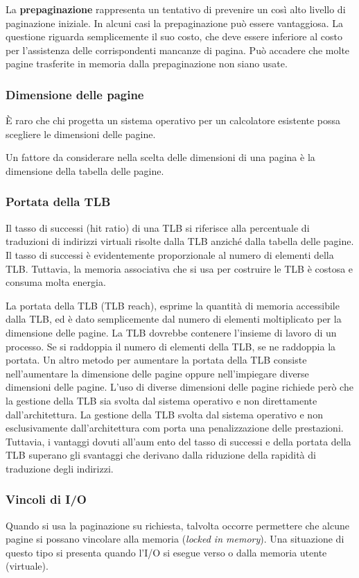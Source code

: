 \documentclass[11pt,a4paper]{article}
\begin{document}
{La \textbf{prepagina­zione} rappresenta un tentativo di prevenire un così alto livello di paginazione iniziale.
In alcuni casi la prepaginazione può essere vantaggiosa. La questione riguarda sempli­cemente il suo costo, che deve essere inferiore al costo per l'assistenza delle corrispondenti
mancanze di pagina. Può accadere che molte pagine trasferite in memoria dalla prepagina­zione non siano usate.

\subsubsection{Dimensione delle pagine}
È raro che chi progetta un sistema operativo per un calcolatore esistente possa scegliere le di­mensioni delle pagine.

Un fattore da considerare nella scelta delle dimensioni di una pagina è la dimensione
della tabella delle pagine.

\subsubsection{Portata della TLB}
Il tasso di successi (hit ratio) di una TLB si rife­risce alla percentuale di traduzioni di indirizzi virtuali risolte dalla TLB anziché dalla tabella
delle pagine. Il tasso di successi è evidentemente proporzionale al numero di elementi della
TLB. Tuttavia, la memoria associativa che si usa per costruire le TLB è costosa e consuma
molta energia.

La portata della TLB (TLB reach), esprime la quantità di me­moria accessibile dalla TLB, ed è dato semplicemente dal numero di elementi moltiplicato per la dimensione delle pagine. La TLB
dovrebbe contenere l'insieme di lavoro di un processo.
Se si rad­doppia il numero di elementi della TLB, se ne raddoppia la portata.
Un altro metodo per aumentare la portata della TLB consiste nell'aumentare la dimen­sione delle pagine oppure nell'impiegare diverse dimensioni delle pagine.
L'uso di diverse dimensioni delle pagine richiede però che la gestione della TLB sia
svolta dal sistema operativo e non direttamente dall'architettura.
La gestione della TLB svolta dal sistema operativo e non
esclusivamente dall'architettura com porta una penalizzazione delle prestazioni. Tuttavia, i
vantaggi dovuti all'aum ento del tasso di successi e della portata della TLB superano gli svan­taggi che derivano dalla riduzione della rapidità di traduzione degli indirizzi.

\subsubsection{Vincoli di I/O}
Quando si usa la paginazione su richiesta, talvolta occorre permettere che alcune pagine si
possano vincolare alla memoria (\emph{locked in memory}). Una situazione di questo tipo si presen­ta quando l'I/O si esegue verso o dalla memoria utente (virtuale).

}
\end{document}
